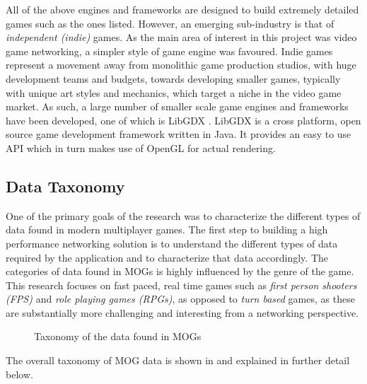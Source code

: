 All of the above engines and frameworks are designed to build extremely detailed games such as the ones listed. However, an emerging sub-industry is that of \textit{independent (indie)} games. As the main area of interest in this project was video game networking, a simpler style of game engine was favoured. Indie games represent a movement away from monolithic game production studios, with huge development teams and budgets, towards developing smaller games, typically with unique art styles and mechanics, which target a niche in the video game market. As such, a large number of smaller scale game engines and frameworks have been developed, one of which is LibGDX \cite{libgdx}. LibGDX is a cross platform, open source game development framework written in Java. It provides an easy to use API which in turn makes use of OpenGL for actual rendering. 

\subsection{Data Taxonomy}\label{sec:taxonomy}
One of the primary goals of the research was to characterize the different types of data found in modern multiplayer games. The first step to building a high performance networking solution is to understand the different types of data required by the application and to characterize that data accordingly. The categories of data found in MOGs is highly influenced by the genre of the game. This research focuses on fast paced, real time games such as \textit{first person shooters (FPS)} and \textit{role playing games (RPGs)}, as opposed to \textit{turn based} games, as these are substantially more challenging and interesting from a networking perspective. 

\begin{figure}[H]
    \centering
    \caption{Taxonomy of the data found in MOGs}
    \label{fig:taxonomy}
\end{figure}


The overall taxonomy of MOG data is shown in  and explained in further detail below.


